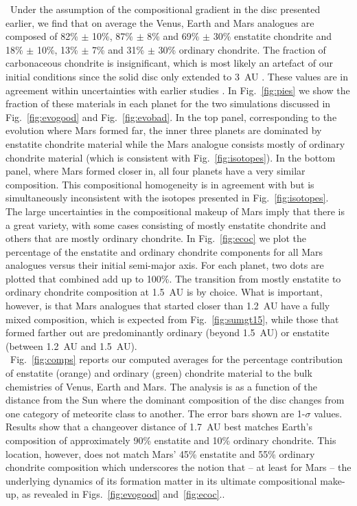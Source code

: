 \documentclass[preprint,5p,times,authoryear]{elsarticle}
\begin{document}
{\ Under the assumption of the compositional gradient in the disc presented earlier, we find that on average the Venus, Earth and 
Mars analogues are composed of 82\% $\pm$ 10\%, 87\% $\pm$ 8\% and 69\% $\pm$ 30\% enstatite chondrite and 18\% $\pm$ 10\%, 13\% $\pm$ 
7\% and 31\% $\pm$ 30\% ordinary chondrite. The fraction of carbonaceous chondrite is insignificant, which is most likely an artefact 
of our initial conditions since the solid disc only extended to 3~AU \citep{B16}. These values are in agreement within uncertainties 
with earlier studies \citep{S99,TD14,D14}. In Fig.~\ref{fig:pies} we show the fraction of these materials in each planet for the two 
simulations discussed in Fig.~\ref{fig:evogood} and Fig.~\ref{fig:evobad}. In the top panel, corresponding to the evolution where Mars 
formed far, the inner three planets are dominated by enstatite chondrite material while the Mars analogue consists mostly of ordinary 
chondrite material (which is consistent with Fig.~\ref{fig:isotopes}). In the bottom panel, where Mars formed closer in, all four 
planets have a very similar composition. This compositional homogeneity is in agreement with \citet{FB16} but is simultaneously 
inconsistent with the isotopes presented in Fig.~\ref{fig:isotopes}.\\

The large uncertainties in the compositional makeup of Mars imply that there is a great variety, with some cases consisting of mostly 
enstatite chondrite and others that are mostly ordinary chondrite. In Fig.~\ref{fig:ecoc} we plot the percentage of the enstatite and 
ordinary chondrite components for all Mars analogues versus their initial semi-major axis. For each planet, two dots are plotted that 
combined add up to 100\%. The transition from mostly enstatite to ordinary chondrite composition at 1.5~AU is by choice. What is 
important, however, is that Mars analogues that started closer than 1.2~AU have a fully mixed composition, which is expected from 
Fig.~\ref{fig:sumgt15}, while those that formed farther out are predominantly ordinary (beyond 1.5~AU) or enstatite (between 1.2~AU 
and 1.5~AU).}\\

{\ Fig.~\ref{fig:comps} reports our computed averages for the percentage contribution of enstatite (orange) and ordinary (green) 
chondrite material to the bulk chemistries of Venus, Earth and Mars. The analysis is as a function of the distance from the Sun where 
the dominant composition of the disc changes from one category of meteorite class to another. The error bars shown are 1-$\sigma$ 
values. Results show that a changeover distance of 1.7~AU best matches Earth's composition of approximately 90\% enstatite and 10\% 
ordinary chondrite. This location, however, does not match Mars' 45\% enstatite and 55\% ordinary chondrite composition which 
underscores the notion that -- at least for Mars -- the underlying dynamics of its formation matter in its ultimate compositional 
make-up, as revealed in Figs.~\ref{fig:evogood} and~\ref{fig:ecoc}.}.\\
\end{document}
